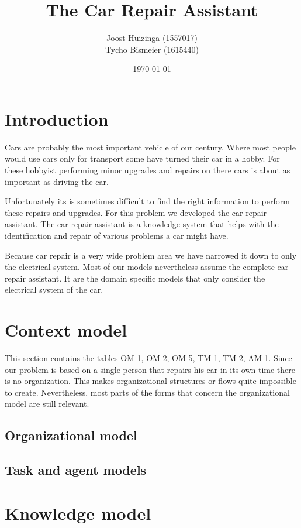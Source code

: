 \documentclass[a4paper,10pt]{article}
\title{The Car Repair Assistant}
\author{
Joost Huizinga (1557017)\\
Tycho Bismeier (1615440)}
\date{\today}
\begin{document}
\maketitle

\tableofcontents

\section{Introduction}
Cars are probably the most important vehicle of our century. Where most people would use cars only for transport some have turned their car in a hobby. For these hobbyist performing minor upgrades and repairs on there cars is about as important as driving the car.

Unfortunately its is sometimes difficult to find the right information to perform these repairs and upgrades. For this problem we developed the car repair assistant. The car repair assistant is a knowledge system that helps with the identification and repair of various problems a car might have.

Because car repair is a very wide problem area we have narrowed it down to only the electrical system. Most of our models nevertheless assume the complete car repair assistant. It are the domain specific models that only consider the electrical system of the car. 

\section{Context model}
This section contains the tables OM-1, OM-2, OM-5, TM-1, TM-2, AM-1. Since our problem is based on a single person that repairs his car in its own time there is no organization. This makes organizational structures or flows quite impossible to create. Nevertheless, most parts of the forms that concern the organizational model are still relevant.

\subsection{Organizational model}




\subsection{Task and agent models}



\section{Knowledge model}
\end{document}
